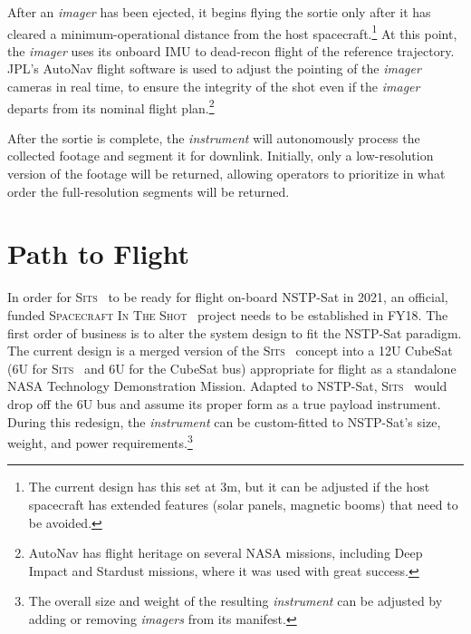 \documentclass{tufte-handout}
\newcommand{\sitslong}[0]{\textsc{Spacecraft In The Shot}}%
\newcommand{\sitsshort}[0]{\textsc{Sits}}%
\begin{document}
After an \textit{imager} has been ejected, it begins flying the sortie only after it
has cleared a minimum-operational distance from the host spacecraft.\footnote{The current
design has this set at 3m, but it can be adjusted if the host spacecraft
has extended features (solar panels, magnetic booms) that need to be 
avoided.} At this point, the \textit{imager} uses its onboard IMU to dead-recon flight
of the reference trajectory. JPL's AutoNav flight software is used to adjust
the pointing of the \textit{imager} cameras in real time, to ensure the integrity of
the shot even if the \textit{imager} departs from its nominal flight plan.\footnote{AutoNav has 
flight heritage on several NASA missions, including Deep Impact and Stardust missions, where it was used with great 
success.} 

After the sortie is complete, the \textit{instrument} will autonomously process the collected
footage and segment it for downlink. Initially, only a low-resolution version of the
footage will be returned, allowing operators to prioritize in what order the 
full-resolution segments will be returned.

\clearpage
\section{Path to Flight}


In order for \sitsshort~ to be ready for flight on-board NSTP-Sat in 2021, an official,
funded \sitslong~ project needs to be established in FY18. The first order of business 
is to alter the system design to fit the NSTP-Sat paradigm. The current design is 
a merged version of the \sitsshort~ concept into a 12U CubeSat (6U for \sitsshort~ 
and 6U for the CubeSat bus) appropriate for flight as a standalone NASA Technology 
Demonstration Mission. Adapted to NSTP-Sat, \sitsshort~ would drop off the 6U bus and 
assume its proper form as a true payload instrument. During this redesign, the 
\textit{instrument} can be custom-fitted to NSTP-Sat's size, weight, and power 
requirements.\footnote{The overall size and weight of the resulting \textit{instrument} can
be adjusted by adding or removing \textit{imagers} from its manifest.} 
\end{document}
